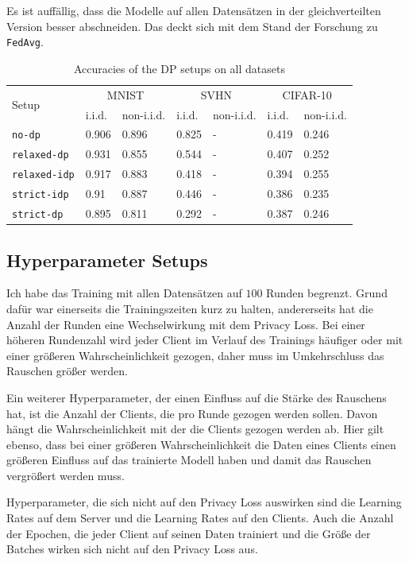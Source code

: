 Es ist auffällig, dass die Modelle auf allen Datensätzen in der gleichverteilten Version besser abschneiden. Das deckt sich mit dem Stand der Forschung zu \texttt{FedAvg}.

\begin{table}
	\centering
	\begin{tabular}{|l|p{4em}|p{4em}|p{4em}|p{4em}|p{4em}|p{4em}|}
		\hline
		\multirow{2}{4em}{Setup} & \multicolumn{2}{c|}{MNIST} & \multicolumn{2}{c|}{SVHN} & \multicolumn{2}{c|}{CIFAR-10} \\
		\cline{2-7}
		& i.i.d. & non-i.i.d. & i.i.d. & non-i.i.d. & i.i.d. & non-i.i.d. \\
		\hline
		\texttt{no-dp} & 0.906 & 0.896 & 0.825 & - & 0.419 & 0.246 \\
		\texttt{relaxed-dp} & 0.931 & 0.855 & 0.544 & - & 0.407 & 0.252 \\
		\texttt{relaxed-idp} & 0.917 & 0.883 & 0.418 & - & 0.394 & 0.255 \\
		\texttt{strict-idp} & 0.91 & 0.887 & 0.446 & - & 0.386 & 0.235 \\
		\texttt{strict-dp} & 0.895 & 0.811 & 0.292 & - & 0.387 & 0.246 \\
		\hline
	\end{tabular}
	\caption{Accuracies of the DP setups on all datasets}
	\label{tab:all-fed-results}
\end{table}

\subsection{Hyperparameter Setups}
Ich habe das Training mit allen Datensätzen auf $100$ Runden begrenzt. Grund dafür war einerseits die Trainingszeiten kurz zu halten, andererseits hat die Anzahl der Runden eine Wechselwirkung mit dem Privacy Loss. Bei einer höheren Rundenzahl wird jeder Client im Verlauf des Trainings häufiger oder mit einer größeren Wahrscheinlichkeit gezogen, daher muss im Umkehrschluss das Rauschen größer werden. 

Ein weiterer Hyperparameter, der einen Einfluss auf die Stärke des Rauschens hat, ist die Anzahl der Clients, die pro Runde gezogen werden sollen. Davon hängt die Wahrscheinlichkeit mit der die Clients gezogen werden ab. Hier gilt ebenso, dass bei einer größeren Wahrscheinlichkeit die Daten eines Clients einen größeren Einfluss auf das trainierte Modell haben und damit das Rauschen vergrößert werden muss.

Hyperparameter, die sich nicht auf den Privacy Loss auswirken sind die Learning Rates auf dem Server und die Learning Rates auf den Clients. Auch die Anzahl der Epochen, die jeder Client auf seinen Daten trainiert und die Größe der Batches wirken sich nicht auf den Privacy Loss aus.

